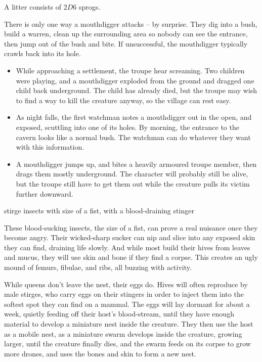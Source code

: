 \begin{multicols}{2}
A litter consists of $2D6$ sprogs.

\showEnc
There is only one way a mouthdigger attacks -- by surprise.  They dig into a bush, build a warren, clean up the surrounding area so nobody can see the entrance, then jump out of the bush and bite.  If unsuccessful, the mouthdigger typically crawls back into its hole.

\begin{itemize}

  \item
  While approaching a settlement, the troupe hear screaming.
  Two children were playing, and a mouthdigger exploded from the ground and dragged one child back underground.
  The child has already died, but the troupe may wish to find a way to kill the creature anyway, so the village can rest easy.
  \item
  As night falls, the first watchman notes a mouthdigger out in the open, and exposed, scuttling into one of its holes.
  By morning, the entrance to the cavern looks like a normal bush.
  The watchman can do whatever they want with this information.
  \item
  A mouthdigger jumps up, and bites a heavily armoured troupe member, then drags them mostly underground.
  The character will probably still be alive, but the troupe still have to get them out while the creature pulls its victim further downward.

\end{itemize}

\mouthdigger

  {stirge}%
  {insects with size of a fist, with a blood-draining stinger}%

These blood-sucking insects, the size of a fist, can prove a real nuisance once they become angry.
Their wicked-sharp sucker can nip and slice into any exposed skin they can find, draining life slowly.
And while most build their hives from leaves and mucus, they will use skin and bone if they find a corpse.
This creates an ugly mound of femurs, fibulae, and ribs, all buzzing with activity.

While queens don't leave the nest, their eggs do.
Hives will often reproduce by male stirges, who carry eggs on their stingers in order to inject them into the softest spot they can find on a mammal.
The eggs will lay dormant for about a week, quietly feeding off their host's blood-stream, until they have enough material to develop a miniature nest inside the creature.
They then use the host as a mobile nest, as a miniature swarm develops inside the creature, growing larger, until the creature finally dies, and the swarm feeds on its corpse to grow more drones, and uses the bones and skin to form a new nest.


\end{multicols}

